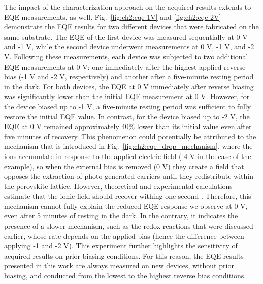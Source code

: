 The impact of the characterization approach on the acquired results extends to EQE measurements, as well. Fig.~\ref{fig:ch2:eqe-1V} and \ref{fig:ch2:eqe-2V} demonstrate the EQE results for two different devices that were fabricated on the same substrate. The EQE of the first device was measured sequentially at 0 V and -1 V, while the second device underwent measurements at 0 V, -1 V, and -2 V. Following these measurements, each device was subjected to two additional EQE measurements at 0 V: one immediately after the highest applied reverse bias (-1 V and -2 V, respectively) and another after a five-minute resting period in the dark. For both devices, the EQE at 0 V immediately after reverse biasing was significantly lower than the initial EQE measurement at 0 V. However, for the device biased up to -1 V, a five-minute resting period was sufficient to fully restore the initial EQE value. In contrast, for the device biased up to -2 V, the EQE at 0 V remained approximately 40\% lower than its initial value even after five minutes of recovery. This phenomenon could potentially be attributed to the mechanism that is introduced in Fig.~\ref{fig:ch2:eqe_drop_mechanism}, where the ions accumulate in response to the applied electric field (-4 V in the case of the example), so when the external bias is removed (0 V) they create a field that opposes the extraction of photo-generated carriers until they redistribute within the perovskite lattice. However, theoretical and experimental calculations estimate that the ionic field should recover withing one second \cite{Bowring2018ReverseCells}. Therefore, this mechanism cannot fully explain the reduced EQE response we observe at 0 V, even after 5 minutes of resting in the dark. In the contrary, it indicates the presence of a slower mechanism, such as the redox reactions that were discussed earlier, whose rate depends on the applied bias (hence the difference between applying -1 and -2 V). This experiment further highlights the sensitivity of acquired results on prior biasing conditions. For this reason, the EQE results presented in this work are always measured on new devices, without prior biasing, and conducted from the lowest to the highest reverse bias conditions.


